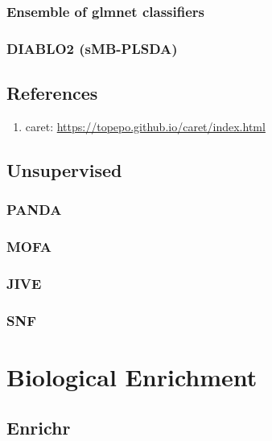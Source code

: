 \documentclass[]{book}
\providecommand{\tightlist}{%
  \setlength{\itemsep}{0pt}\setlength{\parskip}{0pt}}
\begin{document}
\subsection{Ensemble of glmnet
classifiers}\label{ensemble-of-glmnet-classifiers}

\subsection{DIABLO2 (sMB-PLSDA)}\label{diablo2-smb-plsda}

\section{References}\label{references-2}

\begin{enumerate}
\def\labelenumi{\arabic{enumi}.}
\tightlist
\item
  caret: \url{https://topepo.github.io/caret/index.html}
\end{enumerate}

\section{Unsupervised}\label{unsupervised}

\subsection{PANDA}\label{panda-1}

\subsection{MOFA}\label{mofa}

\subsection{JIVE}\label{jive}

\subsection{SNF}\label{snf}

\chapter{Biological Enrichment}\label{bio-enrichment}

\section{Enrichr}\label{enrichr}
\end{document}
